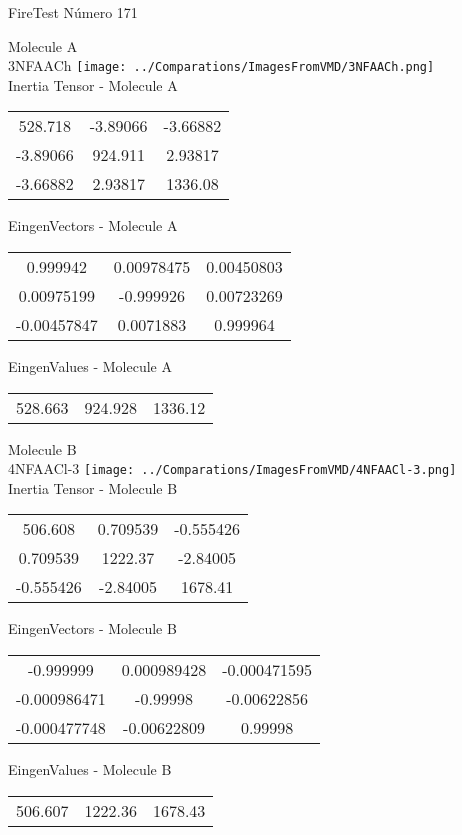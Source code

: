 \vtab[-2cm]
\begin{center}
{\large FireTest \tab Número 171}
\end{center}
\begin{multicols}{2}
\begin{center}

Molecule A \\ 
3NFAACh
\texttt{[image: ../Comparations/ImagesFromVMD/3NFAACh.png]}
\\
Inertia Tensor - Molecule A \\
\vtab

\begin{tabular}{|c c c|}
528.718	 & 	-3.89066	 & 	-3.66882	 \\
-3.89066	 & 	924.911	 & 	2.93817	 \\
-3.66882	 & 	2.93817	 & 	1336.08
\end{tabular}

\vtab
 EingenVectors - Molecule A     \\
\vtab
\begin{tabular}{|c c c|}
0.999942	 & 	0.00978475	 & 	0.00450803	 \\
0.00975199	 & 	-0.999926	 & 	0.00723269	 \\
-0.00457847	 & 	0.0071883	 & 	0.999964
\end{tabular}

\vtab
 EingenValues - Molecule A     \\
\vtab
\begin{tabular}{|c c c|}
528.663	 & 	924.928	 & 	1336.12	 \\
\end{tabular}
\columnbreak

Molecule B \\ 
4NFAACl-3
\texttt{[image: ../Comparations/ImagesFromVMD/4NFAACl-3.png]}
\\
Inertia Tensor - Molecule B \\
\vtab

\begin{tabular}{|c c c|}
506.608	 & 	0.709539	 & 	-0.555426	 \\
0.709539	 & 	1222.37	 & 	-2.84005	 \\
-0.555426	 & 	-2.84005	 & 	1678.41
\end{tabular}

\vtab
 EingenVectors - Molecule B     \\
\vtab
\begin{tabular}{|c c c|}
-0.999999	 & 	0.000989428	 & 	-0.000471595	 \\
-0.000986471	 & 	-0.99998	 & 	-0.00622856	 \\
-0.000477748	 & 	-0.00622809	 & 	0.99998
\end{tabular}

\vtab
 EingenValues - Molecule B     \\
\vtab
\begin{tabular}{|c c c|}
506.607	 & 	1222.36	 & 	1678.43	 \\
\end{tabular}

\end{center}
\end{multicols}
